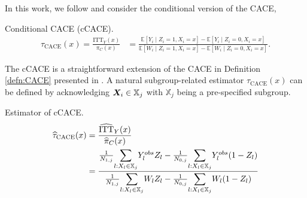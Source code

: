 In this work, we follow \cite{bargagli-stoffi_heterogeneous_2022} and consider the conditional version of the CACE, 

\begin{defn}{Conditional CACE (cCACE).}
   \label{defn:cCACE}
   \begin{align*}
      \tau_{\text{CACE}}(x) = \frac{\text{ITT}_{Y}(x)}{\pi_C(x)} &= \frac{\mathbb{E}[Y_i \mid Z_i = 1, X_i = x] - \mathbb{E}[Y_i \mid Z_i = 0, X_i = x]}{\mathbb{E}[W_i \mid Z_i = 1, X_i = x] - \mathbb{E}[W_i \mid Z_i = 0, X_i = x]}.
   \end{align*}
\end{defn}

The cCACE is a straightforward extension of the CACE in Definition \ref{defn:CACE} presented in \cite{bargagli-stoffi_heterogeneous_2022}. A natural subgroup-related estimator $\tau_{\text{CACE}}(x)$ can be defined by acknowledging $\bm X_i \in \mathbb{X}_j$ with $\mathbb{X}_j$ being a pre-specified subgroup.

\begin{defn}{Estimator of cCACE.}
   \label{defn:cCACE_estimator}
   \begin{align*}
      \widehat\tau_{\text{CACE}}(x) &= \frac{\widehat{\text{ITT}}_{Y}(x)}{\widehat{\pi}_C(x)} \\
      &= \frac{\frac{1}{N_{1,j}} \mathlarger{\sum}_{l: X_l \in \mathbb{X}_j} Y^{obs}_l Z_l - \frac{1}{N_{0,j}} \mathlarger{\sum}_{l: X_l \in \mathbb{X}_j} Y^{obs}_l (1 - Z_l)}{\frac{1}{N_{1,j}} \mathlarger{\sum}_{l: X_l \in \mathbb{X}_j} W_l Z_l - \frac{1}{N_{0,j}} \mathlarger{\sum}_{l: X_l \in \mathbb{X}_j} W_l (1 - Z_l)
      }\\
   \end{align*}
\end{defn}


